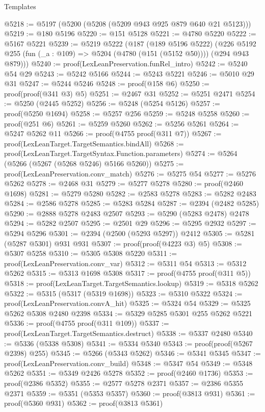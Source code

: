 \begin{lexlean}{Templates}
\begin{coremodule}
@5218 := @5197 (@5200 (@5208 (@5209 @943 @925 @879 @640 @21 @5123)))
@5219 := @180 @5196
@5220 := @151 @5128
@5221 := @4780 @5220
@5222 := @5167 @5221
@5239 := @5219
    @5222
    (@187
      (@189 @5196 @5222)
      (@226 @5192 @255 (fun (_a : @109) => @5204 (@4780 (@151 (@5152 @50)))) (@294 @943 @879)))
@5240 := proof(LexLeanPreservation.funRel_intro)
@5242 := @5240 @54 @29
@5243 := @5242 @5166
@5244 := @5243 @5221
@5246 := @5010 @29 @31
@5247 := @5244 @5246
@5248 := proof(@158 @6)
@5250 := proof(proof(@341 @3) @5)
@5251 := @2467 @31
@5252 := @5251 @2471
@5254 := @5250 (@2445 @5252)
@5256 := @5248 (@5254 @5126)
@5257 := proof(@5250 @1694)
@5258 := @5257 @256
@5259 := @5248 @5258
@5260 := proof(@251 @6)
@5261 := @5259 @5260
@5262 := @5256 @5261
@5264 := @5247 @5262 @11
@5266 := proof(@4755 proof(@311 @7))
@5267 := proof(LexLeanTarget.TargetSemantics.bindAll)
@5268 := proof(LexLeanTarget.TargetSyntax.Function.parameters)
@5274 := @5264 (@5266 (@5267 (@5268 @5246) @5166 @5260))
@5275 := proof(LexLeanPreservation.conv_match)
@5276 := @5275 @54
@5277 := @5276 @5262
@5278 := @2468 @31
@5279 := @5277 @5278
@5280 := proof(@2460 @1698)
@5281 := @5279 @5280
@5282 := @2583 @5278
@5283 := @5282 @2483
@5284 := @2586 @5278
@5285 := @5283 @5284
@5287 := @2394 (@2482 @5285)
@5290 := @2888 @5278 @2483 @2507
@5293 := @5290 (@5283 @2478) @2478
@5294 := @5282 @2507
@5295 := @2501 @29
@5296 := @5295 @2932
@5297 := @5294 @5296
@5301 := @2394 (@2500 (@5293 @5297)) @2412
@5305 := @5281 (@5287 @5301) @931 @931
@5307 := proof(proof(@4223 @3) @5)
@5308 := @5307 @5258
@5310 := @5305 @5308 @5220
@5311 := proof(LexLeanPreservation.conv_var)
@5312 := @5311 @54
@5313 := @5312 @5262
@5315 := @5313 @1698 @5308
@5317 := proof(@4755 proof(@311 @5))
@5318 := proof(LexLeanTarget.TargetSemantics.lookup)
@5319 := @5318 @5262
@5322 := @5315 (@5317 (@5319 @1698))
@5323 := @5310 @5322
@5324 := proof(LexLeanPreservation.convA_hit)
@5325 := @5324 @54
@5329 := @5325 @5262 @5308 @2480 @2398
@5334 := @5329 @5285 @5301 @255 @5262 @5221
@5336 := proof(@4755 proof(@311 @109))
@5337 := proof(LexLeanTarget.TargetSemantics.destruct)
@5338 := @5337 @2480
@5340 := @5336 (@5338 @5308)
@5341 := @5334 @5340
@5343 := proof(proof(@5267 @2398) @255)
@5345 := @5266 (@5343 @5262)
@5346 := @5341 @5345
@5347 := proof(LexLeanPreservation.conv_build)
@5348 := @5347 @54
@5349 := @5348 @5262
@5351 := @5349 @2426 @5278
@5352 := proof(@2460 @1736)
@5353 := proof(@2386 @5352)
@5355 := @2577 @5278 @2371
@5357 := @2386 @5355 @2371
@5359 := @5351 (@5353 @5357)
@5360 := proof(@3813 @931)
@5361 := proof(@5360 @931)
@5362 := proof(@3813 @5361)

\end{coremodule}
\end{lexlean}

